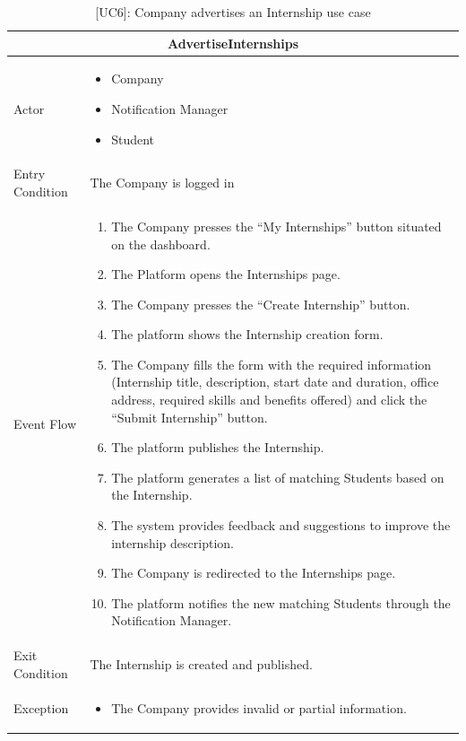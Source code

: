 \begin{table}[H]
    \centering
    \begin{tabular}{|p{3cm}|p{12cm}|}
    \hline
    \multicolumn{2}{|c|}{\textbf{AdvertiseInternships}} \\ \hline
    Actor & 
    \begin{itemize}
        \item Company
        \item Notification Manager
        \item Student
    \end{itemize}\\ \hline
    Entry Condition & The Company is logged in\\ \hline
    Event Flow &
    \begin{enumerate}         
        \item The Company presses the “My Internships” button situated on the dashboard.
        \item The Platform opens the Internships page.
        \item The Company presses the “Create Internship” button.
        \item The platform shows the Internship creation form.
        \item The Company fills the form with the required information (Internship title, description, start date and duration, office address, required skills and benefits offered) and click the “Submit Internship” button.
        \item The platform publishes the Internship.
        \item The platform generates a list of matching Students based on the Internship.
        \item The system provides feedback and suggestions to improve the internship description.
        \item The Company is redirected to the Internships page.
        \item The platform notifies the new matching Students through the Notification Manager. 
    \end{enumerate} \\ \hline
    Exit Condition & The Internship is created and published.\\ \hline
    Exception & 
    \begin{itemize}        
        \item The Company provides invalid or partial information.
    \end{itemize} \\ \hline
    \end{tabular}
    \caption{[UC6]: Company advertises an Internship use case}
    \label{tab:UC6}
\end{table}

